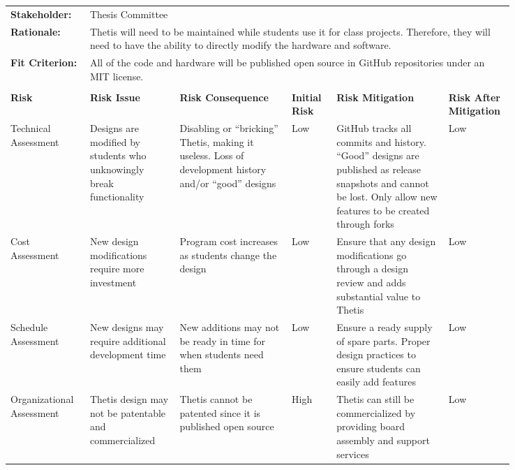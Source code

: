 \begin{landscape}
{\begin{longtable}{| p{0.12\linewidth} | p{0.16\linewidth} |  p{0.20\linewidth} | p{0.08\linewidth} | p{0.20\linewidth} | p{0.08\linewidth} |}
	\hline
	\rowcolor[gray]{0.8}
	\multicolumn{6}{|c|}{ } \\
	\hline
	\textbf{Stakeholder:} & \multicolumn{5}{|l|}{Thesis Committee} \\
	\hline
	\textbf{Rationale:} & \multicolumn{5}{|p{0.8\linewidth}|}{Thetis will need to be maintained while students use it for class projects. Therefore, they will need to have the ability to directly modify the hardware and software.} \\
	\hline
	\textbf{Fit Criterion:} & \multicolumn{5}{|p{0.8\linewidth}|}{All of the code and hardware will be published open source in GitHub repositories under an MIT license.} \\
	\hline
	\rowcolor[gray]{0.8}
	\multicolumn{6}{|c|}{ } \\
	\hline
	\textbf{Risk} & \textbf{Risk Issue} & \textbf{Risk Consequence} & \textbf{Initial Risk} & \textbf{Risk Mitigation} & \textbf{Risk \newline After \newline Mitigation} \\
	\hline
	Technical \newline Assessment & Designs are modified by students who unknowingly break functionality & Disabling or ``bricking'' Thetis, making it useless. \newline Loss of development history and/or ``good'' designs & \cellcolor{green} Low & GitHub tracks all commits and history. \newline ``Good'' designs are published as release snapshots and cannot be lost. \newline Only allow new features to be created through forks & \cellcolor{green} Low \\
	\hline
	Cost \newline Assessment & New design modifications require more investment & Program cost increases as students change the design & \cellcolor{green} Low & Ensure that any design modifications go through a design review and adds substantial value to Thetis & \cellcolor{green} Low \\
	\hline
	Schedule \newline Assessment & New designs may require additional development time & New additions may not be ready in time for when students need them & \cellcolor{green} Low & Ensure a ready supply of spare parts. \newline Proper design practices to ensure students can easily add features & \cellcolor{green} Low \\
	\hline
	Organizational \newline Assessment & Thetis design may not be patentable and commercialized & Thetis cannot be patented since it is published open source & \cellcolor{red} High & Thetis can still be commercialized by providing board assembly and support services & \cellcolor{green} Low \\

\end{longtable}}
\end{landscape}
